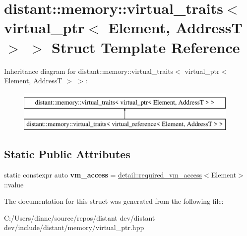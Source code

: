 \hypertarget{structdistant_1_1memory_1_1virtual__traits_3_01virtual__ptr_3_01_element_00_01_address_t_01_4_01_4}{}\section{distant\+:\+:memory\+:\+:virtual\+\_\+traits$<$ virtual\+\_\+ptr$<$ Element, AddressT $>$ $>$ Struct Template Reference}
\label{structdistant_1_1memory_1_1virtual__traits_3_01virtual__ptr_3_01_element_00_01_address_t_01_4_01_4}
Inheritance diagram for distant\+:\+:memory\+:\+:virtual\+\_\+traits$<$ virtual\+\_\+ptr$<$ Element, AddressT $>$ $>$\+:\begin{figure}[H]
\begin{center}
\leavevmode
\includegraphics[height=2.000000cm]{structdistant_1_1memory_1_1virtual__traits_3_01virtual__ptr_3_01_element_00_01_address_t_01_4_01_4}
\end{center}
\end{figure}
\subsection*{Static Public Attributes}
\begin{DoxyCompactItemize}
\item 
\mbox{\label{structdistant_1_1memory_1_1virtual__traits_3_01virtual__ptr_3_01_element_00_01_address_t_01_4_01_4_ac7737f243d20ae767ae91db79add8c1b}} 
static constexpr auto {\bfseries vm\+\_\+access} = \mbox{\hyperlink{structdistant_1_1memory_1_1detail_1_1required__vm__access}{detail\+::required\+\_\+vm\+\_\+access}}$<$Element$>$\+::value
\end{DoxyCompactItemize}


The documentation for this struct was generated from the following file\+:\begin{DoxyCompactItemize}
\item 
C\+:/\+Users/dinne/source/repos/distant dev/distant dev/include/distant/memory/virtual\+\_\+ptr.\+hpp\end{DoxyCompactItemize}
